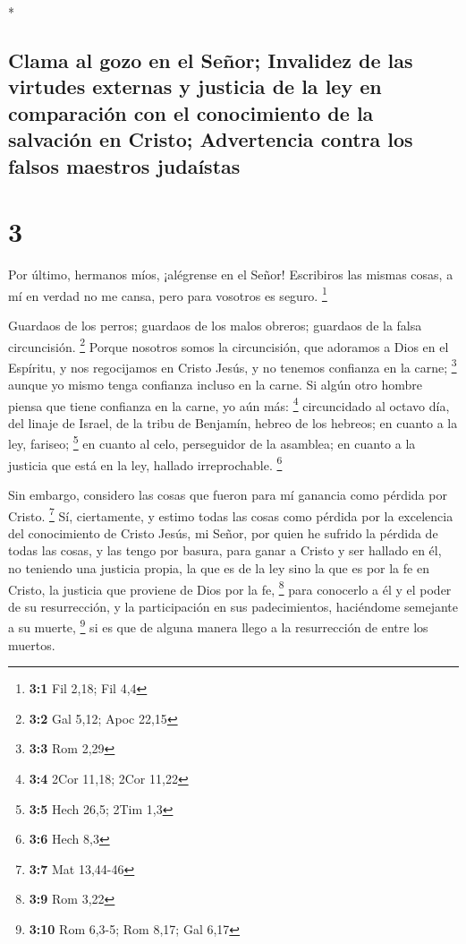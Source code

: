 \begin{paracol}{2}
\begin{otherlanguage}{english}
\end{otherlanguage}

\switchcolumn[0]*

\hypertarget{clama-al-gozo-en-el-seuxf1or-invalidez-de-las-virtudes-externas-y-justicia-de-la-ley-en-comparaciuxf3n-con-el-conocimiento-de-la-salvaciuxf3n-en-cristo-advertencia-contra-los-falsos-maestros-judauxedstas}{%
\subsection{Clama al gozo en el Señor; Invalidez de las virtudes
externas y justicia de la ley en comparación con el conocimiento de la
salvación en Cristo; Advertencia contra los falsos maestros
judaístas}\label{clama-al-gozo-en-el-seuxf1or-invalidez-de-las-virtudes-externas-y-justicia-de-la-ley-en-comparaciuxf3n-con-el-conocimiento-de-la-salvaciuxf3n-en-cristo-advertencia-contra-los-falsos-maestros-judauxedstas}}

\hypertarget{section-4}{%
\section{3}\label{section-4}}

 Por último, hermanos míos, ¡alégrense en el Señor!
Escribiros las mismas cosas, a mí en verdad no me cansa, pero para
vosotros es seguro. \footnote{\textbf{3:1} Fil 2,18; Fil 4,4}

 Guardaos de los perros; guardaos de los malos obreros;
guardaos de la falsa circuncisión. \footnote{\textbf{3:2} Gal 5,12; Apoc
  22,15}  Porque nosotros somos la circuncisión, que
adoramos a Dios en el Espíritu, y nos regocijamos en Cristo Jesús, y no
tenemos confianza en la carne; \footnote{\textbf{3:3} Rom 2,29}
 aunque yo mismo tenga confianza incluso en la carne. Si
algún otro hombre piensa que tiene confianza en la carne, yo aún más:
\footnote{\textbf{3:4} 2Cor 11,18; 2Cor 11,22} 
circuncidado al octavo día, del linaje de Israel, de la tribu de
Benjamín, hebreo de los hebreos; en cuanto a la ley, fariseo;
\footnote{\textbf{3:5} Hech 26,5; 2Tim 1,3}  en cuanto al
celo, perseguidor de la asamblea; en cuanto a la justicia que está en la
ley, hallado irreprochable. \footnote{\textbf{3:6} Hech 8,3}

 Sin embargo, considero las cosas que fueron para mí
ganancia como pérdida por Cristo. \footnote{\textbf{3:7} Mat 13,44-46}
 Sí, ciertamente, y estimo todas las cosas como pérdida
por la excelencia del conocimiento de Cristo Jesús, mi Señor, por quien
he sufrido la pérdida de todas las cosas, y las tengo por basura, para
ganar a Cristo  y ser hallado en él, no teniendo una
justicia propia, la que es de la ley sino la que es por la fe en Cristo,
la justicia que proviene de Dios por la fe, \footnote{\textbf{3:9} Rom
  3,22}  para conocerlo a él y el poder de su
resurrección, y la participación en sus padecimientos, haciéndome
semejante a su muerte, \footnote{\textbf{3:10} Rom 6,3-5; Rom 8,17; Gal
  6,17}  si es que de alguna manera llego a la
resurrección de entre los muertos.


\end{paracol}
